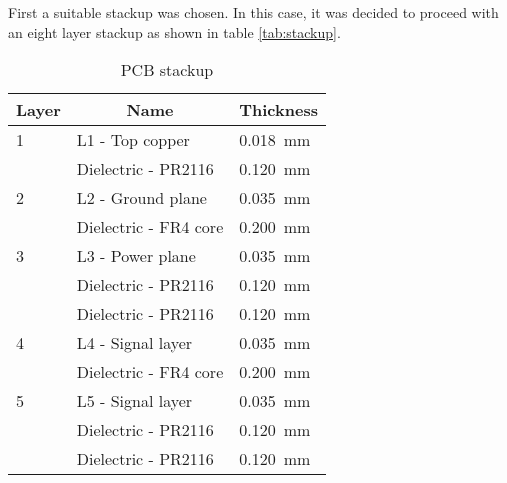 First a suitable stackup was chosen. In this case, it was decided to proceed with an eight layer stackup as shown in table \ref{tab:stackup}. 
\FloatBarrier
\begin{table}[htp!]
    \caption{PCB stackup}
    \begin{tabular}{|l|l|l|}
    \hline
    \multicolumn{1}{|c|}{\textbf{Layer}} & \multicolumn{1}{c|}{\textbf{Name}} & \multicolumn{1}{c|}{\textbf{Thickness}} \\ \hline
    1                                    & L1 - Top copper                    & \SI{0.018}{\milli\meter}                                   \\ \hline
                                         & Dielectric - PR2116                & \SI{0.120}{\milli\meter}                                   \\ \hline
    2                                    & L2 - Ground plane                  & \SI{0.035}{\milli\meter}                                   \\ \hline
                                         & Dielectric - FR4 core              & \SI{0.200}{\milli\meter}                                   \\ \hline
    3                                    & L3 - Power plane                   & \SI{0.035}{\milli\meter}                                   \\ \hline
                                         & Dielectric - PR2116                & \SI{0.120}{\milli\meter}                                   \\ \hline
                                         & Dielectric - PR2116                & \SI{0.120}{\milli\meter}                                   \\ \hline
    4                                    & L4 - Signal layer                  & \SI{0.035}{\milli\meter}                                   \\ \hline
                                         & Dielectric - FR4 core              & \SI{0.200}{\milli\meter}                                   \\ \hline
    5                                    & L5 - Signal layer                  & \SI{0.035}{\milli\meter}                                   \\ \hline
                                         & Dielectric - PR2116                & \SI{0.120}{\milli\meter}                                   \\ \hline
                                         & Dielectric - PR2116                & \SI{0.120}{\milli\meter}                                   \\ \hline

\end{tabular}
\end{table}
